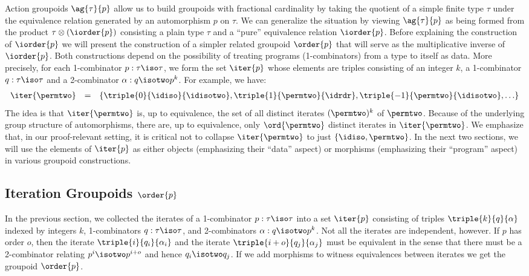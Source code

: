 Action groupoids $\ag{\tau}{p}$ allow us to build groupoids with
fractional cardinality by taking the quotient of a simple finite type
$\tau$ under the equivalence relation generated by an automorphism $p$
on $\tau$. We can generalize the situation by viewing $\ag{\tau}{p}$
as being formed from the product $\tau \otimes (\iorder{p})$
consisting a plain type $\tau$ and a ``pure'' equivalence relation
$\iorder{p}$. Before explaining the construction of $\iorder{p}$ we
will present the construction of a simpler related groupoid
$\order{p}$ that will serve as the multiplicative inverse of
$\iorder{p}$. Both constructions depend on the possibility of treating
programs (1-combinators) from a type to itself as data. More
precisely, for each 1-combinator $p : \tau\iso\tau$, we form the set
$\iter{p}$ whose elements are triples consisting of an integer $k$, a
1-combinator $q : \tau\iso\tau$ and a 2-combinator
$\alpha : q \isotwo p^k$.  For example, we have:
\[\begin{array}{rcl}
\iter{\permtwo} &=& \{ \triple{0}{\idiso}{\idisotwo},\triple{1}{\permtwo}{\idrdr}, \triple{-1}{\permtwo}{\idisotwo}, \ldots \}
\end{array}\]
The idea is that $\iter{\permtwo}$ is, up to equivalence, the set of all
distinct iterates $(\permtwo)^k$ of $\permtwo$.  Because of the underlying group
structure of automorphisms, there are, up to equivalence, only
$\ord{\permtwo}$ distinct iterates in $\iter{\permtwo}$.  We emphasize that, in
our proof-relevant setting, it is critical not to collapse
$\iter{\permtwo}$ to just $\{ \idiso, \permtwo \}$. In the next two sections, we
will use the elements of $\iter{p}$ as either objects (emphasizing
their ``data'' aspect) or morphisms (emphasizing their ``program''
aspect) in various groupoid constructions.

\subsection{Iteration Groupoids $\order{p}$}

In the previous section, we collected the iterates of a 1-combinator
$p : \tau\iso\tau$ into a set $\iter{p}$ consisting of triples
$\triple{k}{q}{\alpha}$ indexed by integers $k$, 1-combinators
$q : \tau\iso\tau$, and 2-combinators $\alpha : q \isotwo p^k$. Not
all the iterates are independent, however. If $p$ has order $o$, then
the iterate $\triple{i}{q_i}{\alpha_i}$ and the iterate
$\triple{i+o}{q_j}{\alpha_j}$ must be equivalent in the sense that
there must be a 2-combinator relating $p^i \isotwo p^{i+o}$ and hence
$q_i \isotwo q_j$. If we add morphisms to witness equivalences between
iterates we get the groupoid $\order{p}$.

